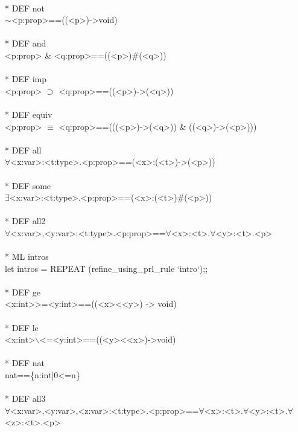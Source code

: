 \N{} \\{}
\N{}* DEF not \\{}
\N{}      \(\sim{}\)<p:prop>==((<p>)->void) \\{}
\N{} \\{}
\N{}* DEF and \\{}
\N{}      <p:prop> \& <q:prop>==((<p>)\#(<q>)) \\{}
\N{} \\{}
\N{}* DEF imp \\{}
\N{}      <p:prop> \(\supset{}\) <q:prop>==((<p>)->(<q>)) \\{}
\N{} \\{}
\N{}* DEF equiv \\{}
\N{}      <p:prop> \(\equiv{}\) <q:prop>==(((<p>)->(<q>)) \& ((<q>)->(<p>))) \\{}
\N{} \\{}
\N{}* DEF all \\{}
\N{}      \(\forall{}\)<x:var>:<t:type>.<p:prop>==(<x>:(<t>)->(<p>)) \\{}
\N{} \\{}
\N{}* DEF some \\{}
\N{}      \(\exists{}\)<x:var>:<t:type>.<p:prop>==(<x>:(<t>)\#(<p>)) \\{}
\N{} \\{}
\N{}* DEF all2 \\{}
\N{}      \(\forall{}\)<x:var>,<y:var>:<t:type>.<p:prop>==\(\forall{}\)<x>:<t>.\(\forall{}\)<y>:<t>.<p> \\{}
\N{} \\{}
\N{}* ML intros \\{}
\N{}      let intros = REPEAT (refine\_using\_prl\_rule `intro`);; \\{}
\N{} \\{}
\N{}* DEF ge \\{}
\N{}      <x:int>>=<y:int>==((<x><<y>) -> void) \\{}
\N{} \\{}
\N{}* DEF le \\{}
\N{}      <x:int>\(\backslash{}\)<=<y:int>==((<y><<x>)->void) \\{}
\N{} \\{}
\N{}* DEF nat \\{}
\N{}      nat==\{n:int|0<=n\} \\{}
\N{} \\{}
\N{}* DEF all3 \\{}
\N{}      \(\forall{}\)<x:var>,<y:var>,<z:var>:<t:type>.<p:prop>==\(\forall{}\)<x>:<t>.\(\forall{}\)<y>:<t>.\(\forall{}\)<z>:<t>.<p> \\{}
